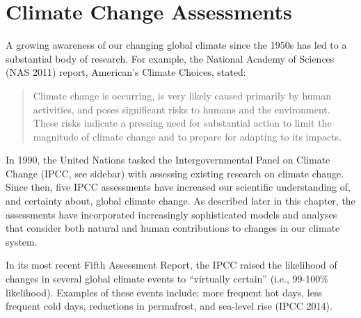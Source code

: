\documentclass[
  letterpaper,
]{scrreprt}\usepackage{amsmath,amssymb}
\begin{document}
\hypertarget{climate-change-assessments}{%
\chapter{Climate Change Assessments}\label{climate-change-assessments}}

A growing awareness of our changing global climate since the 1950s has
led to a substantial body of research. For example, the National Academy
of Sciences (NAS 2011) report, American's Climate Choices, stated:

\begin{quote}
Climate change is occurring, is very likely caused primarily by human
activities, and poses significant risks to humans and the environment.
These risks indicate a pressing need for substantial action to limit the
magnitude of climate change and to prepare for adapting to its impacts.
\end{quote}

In 1990, the United Nations tasked the Intergovernmental Panel on
Climate Change (IPCC, see sidebar) with assessing existing research on
climate change. Since then, five IPCC assessments have increased our
scientific understanding of, and certainty about, global climate change.
As described later in this chapter, the assessments have incorporated
increasingly sophisticated models and analyses that consider both
natural and human contributions to changes in our climate system.

In its most recent Fifth Assessment Report, the IPCC raised the
likelihood of changes in several global climate events to ``virtually
certain'' (i.e., 99-100\% likelihood). Examples of these events include:
more frequent hot days, less frequent cold days, reductions in
permafrost, and sea-level rise (IPCC 2014).
\end{document}
